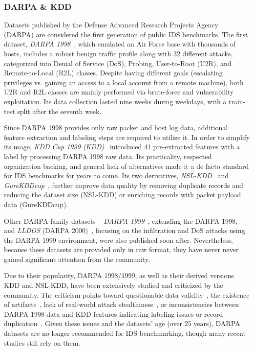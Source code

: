 \subsubsection{DARPA \& KDD}
\label{sssec:ndatasurv_general_darpa}

Datasets published by the Defense Advanced Research Projects Agency (DARPA) are considered the first generation of public IDS benchmarks. The first dataset, \emph{DARPA 1998}~\cite{lippmann2000_darpa1998}, which emulated an Air Force base with thousands of hosts, includes a robust benign traffic profile along with 32 different attacks, categorized into Denial of Service (DoS), Probing, User-to-Root (U2R), and Remote-to-Local (R2L) classes. Despite having different goals (escalating privileges vs. gaining an access to a local account from a remote machine), both U2R and R2L classes are mainly performed via brute-force and vulnerability exploitation. Its data collection lasted nine weeks during weekdays, with a train-test split after the seventh week.

Since DARPA 1998 provides only raw packet and host log data, additional feature extraction and labeling steps are required to utilize it. In order to simplify its usage, \emph{KDD Cup 1999 (KDD)}~\cite{stolfo2000_costbased_modeling_ids_kdd99} introduced 41 pre-extracted features with a label by processing DARPA 1998 raw data. Its practicality, respected organization backing, and general lack of alternatives made it a de facto standard for IDS benchmarks for years to come. Its two derivatives, \emph{NSL-KDD}~\cite{tavallaee2009_nslkdd} and \emph{GureKDDcup}~\cite{perona2008_gurekddcup}, further improve data quality by removing duplicate records and reducing the dataset size (NSL-KDD) or enriching records with packet payload data (GureKDDcup).

Other DARPA-family datasets -- \emph{DARPA 1999}~\cite{lipmann2000_darpa1999}, extending the DARPA 1998, and \emph{LLDOS} (DARPA 2000)~\cite{haines2000_darpa2000}, focusing on the infiltration and DoS attacks using the DARPA 1999 environment, were also published soon after. Nevertheless, because these datasets are provided only in raw format,  they have never never gained significant attention from the community.

Due to their popularity, DARPA 1998/1999, as well as their derived versions KDD and NSL-KDD, have been extensively studied and criticized by the community. The criticism points toward questionable data validity~\cite{mchugh2000_darpa_data_critique}, the existence of artifacts~\cite{mahoney2003_darpa1999_critique}, lack of real-world attack stealthiness~\cite{silva2020_attackers_statistical_analysis_kdd}, or inconsistencies between DARPA 1998 data and KDD features indicating labeling issues or record duplication~\cite{altobi2018_kdd99_genfaults}. Given these issues and the datasets' age (over 25 years), DARPA datasets are no longer recommended for IDS  benchmarking, though many recent studies still rely on them.

